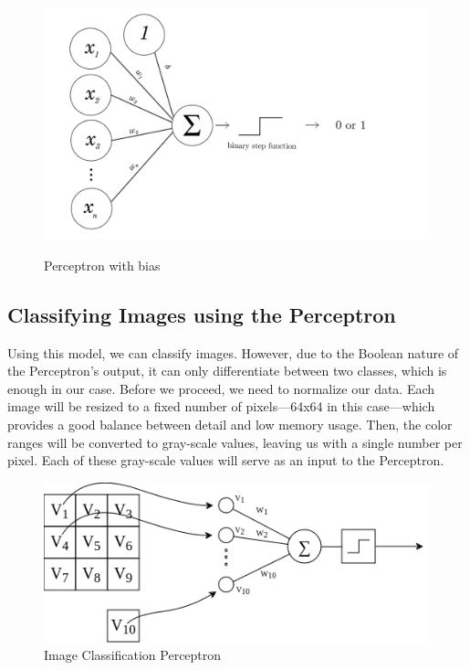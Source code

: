 \documentclass{article}
\begin{document}
\begin{figure}[ht]
    \caption*{Perceptron with bias}
    \centering
    \includegraphics[width=0.75\linewidth]{assets/perceptron/perceptron-bias.png}
    \label{fig:perceptron-bias}
\end{figure}

\newpage

\subsection{Classifying Images using the Perceptron}

Using this model, we can classify images. However, due to the Boolean nature of the Perceptron's output, it can only differentiate between two classes, which is enough in our case. Before we proceed, we need to normalize our data. Each image will be resized to a fixed number of pixels—64x64 in this case—which provides a good balance between detail and low memory usage. Then, the color ranges will be converted to gray-scale values, leaving us with a single number per pixel. Each of these gray-scale values will serve as an input to the Perceptron.

\begin{figure}[ht]
    \centering
    \includegraphics[width=0.75\linewidth]{assets/perceptron/perceptron-image-classification.png}
    \caption*{Image Classification Perceptron}
    \label{fig:perceptron-image-classification}
\end{figure}
\end{document}
